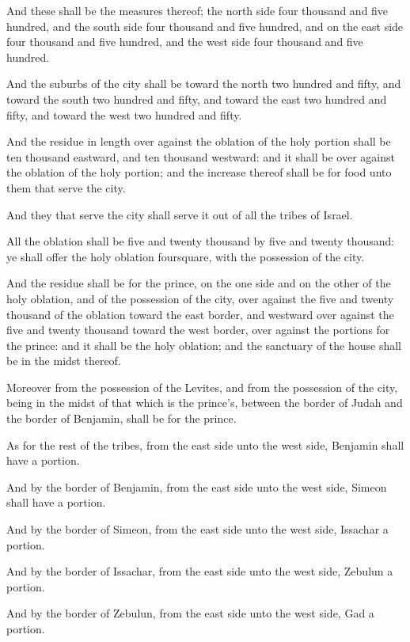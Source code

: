 \verse And these shall be the measures thereof; the north side four thousand and five hundred, and the south side four thousand and five hundred, and on the east side four thousand and five hundred, and the west side four thousand and five hundred.

\verse And the suburbs of the city shall be toward the north two hundred and fifty, and toward the south two hundred and fifty, and toward the east two hundred and fifty, and toward the west two hundred and fifty.

\verse And the residue in length over against the oblation of the holy portion shall be ten thousand eastward, and ten thousand westward: and it shall be over against the oblation of the holy portion; and the increase thereof shall be for food unto them that serve the city.

\verse And they that serve the city shall serve it out of all the tribes of Israel.

\verse All the oblation shall be five and twenty thousand by five and twenty thousand: ye shall offer the holy oblation foursquare, with the possession of the city.

\verse And the residue shall be for the prince, on the one side and on the other of the holy oblation, and of the possession of the city, over against the five and twenty thousand of the oblation toward the east border, and westward over against the five and twenty thousand toward the west border, over against the portions for the prince: and it shall be the holy oblation; and the sanctuary of the house shall be in the midst thereof.

\verse Moreover from the possession of the Levites, and from the possession of the city, being in the midst of that which is the prince's, between the border of Judah and the border of Benjamin, shall be for the prince.

\verse As for the rest of the tribes, from the east side unto the west side, Benjamin shall have a portion.

\verse And by the border of Benjamin, from the east side unto the west side, Simeon shall have a portion.

\verse And by the border of Simeon, from the east side unto the west side, Issachar a portion.

\verse And by the border of Issachar, from the east side unto the west side, Zebulun a portion.

\verse And by the border of Zebulun, from the east side unto the west side, Gad a portion.

